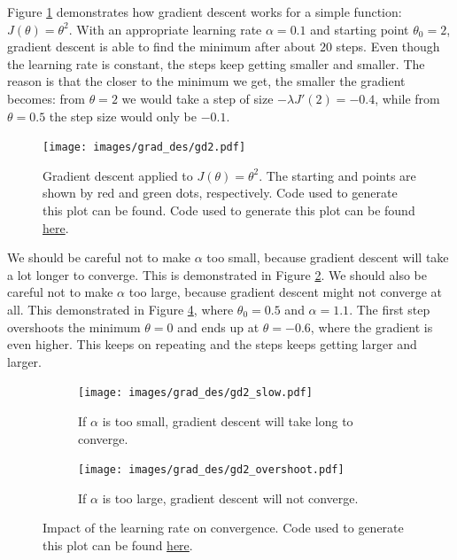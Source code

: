 \documentclass{article}
\theoremstyle{definition}
\begin{document}
Figure \ref{graddes-fig:gd2} demonstrates how gradient descent works for a simple function: $J(\theta)=\theta^2$. With an appropriate learning rate $\alpha=0.1$ and starting point $\theta_0=2$, gradient descent is able to find the minimum after about $20$ steps. Even though the learning rate is constant, the steps keep getting smaller and smaller. The reason is that the closer to the minimum we get, the smaller the gradient becomes: from $\theta = 2$ we would take a step of size $-\lambda J'(2) = -0.4$, while from $\theta = 0.5$ the step size would only be $-0.1$.

\begin{figure}[ht]
\centering
\texttt{[image: images/grad\_des/gd2.pdf]}
\caption{Gradient descent applied to $J(\theta)=\theta^2$. The starting and points are shown by red and green dots, respectively. Code used to generate this plot can be found. Code used to generate this plot can be found \href{https://github.com/siavashaslanbeigi/ml_notes/blob/master/src/grad_des/basics.ipynb}{\color{blue} here}.}
\label{graddes-fig:gd2}
\end{figure}

We should be careful not to make $\alpha$ too small, because gradient descent will take a lot longer to converge. This is demonstrated in Figure \ref{graddes-fig:gd2-slow}.
We should also be careful not to make $\alpha$ too large, because gradient descent 
might not converge at all. This demonstrated in Figure \ref{graddes-fig:gd2-overshoot}, where $\theta_0=0.5$ and $\alpha = 1.1$. The first step overshoots the minimum $\theta=0$ and ends up at $\theta=-0.6$, where the gradient is even higher. This keeps on repeating and the steps keeps getting larger and larger. 

\begin{figure}[ht]
    \begin{subfigure}[ht]{\linewidth}
        \centering
        \texttt{[image: images/grad\_des/gd2\_slow.pdf]}
        \caption{If $\alpha$ is too small, gradient descent will take long to converge.}
        \label{graddes-fig:gd2-slow}
    \end{subfigure}%
    
    \begin{subfigure}[ht]{\linewidth}
        \centering
        \texttt{[image: images/grad\_des/gd2\_overshoot.pdf]}
        \caption{If $\alpha$ is too large, gradient descent will not converge.}
        \label{graddes-fig:gd2-overshoot}
    \end{subfigure}%
    
    \caption{Impact of the learning rate on convergence. Code used to generate this plot can be found \href{https://github.com/siavashaslanbeigi/ml_notes/blob/master/src/grad_des/basics.ipynb}{\color{blue} here}.}
\end{figure}
\end{document}
